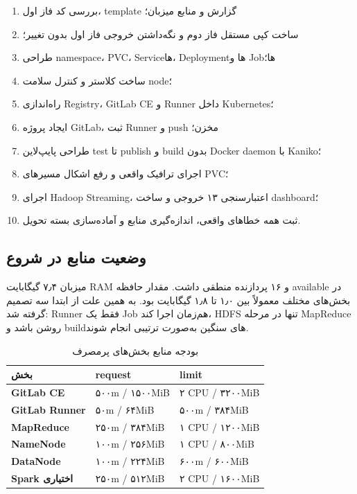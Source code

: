 \documentclass[12pt,a4paper]{article}
\newcommand{\eng}[1]{\lr{#1}}
\begin{document}
\begin{enumerate}
  \item بررسی کد فاز اول، template گزارش و منابع میزبان؛
  \item ساخت کپی مستقل فاز دوم و نگه‌داشتن خروجی فاز اول بدون تغییر؛
  \item طراحی namespace، PVC، Serviceها، Deploymentها و Jobها؛
  \item ساخت کلاستر \eng{kind} و کنترل سلامت node؛
  \item راه‌اندازی Registry، GitLab CE و Runner داخل Kubernetes؛
  \item ایجاد پروژه GitLab، ثبت Runner و push مخزن؛
  \item طراحی پایپ‌لاین test تا publish و build بدون Docker daemon با Kaniko؛
  \item اجرای ترافیک واقعی و رفع اشکال مسیرهای PVC؛
  \item اجرای Hadoop Streaming، اعتبارسنجی ۱۳ خروجی و ساخت dashboard؛
  \item ثبت همه خطاهای واقعی، اندازه‌گیری منابع و آماده‌سازی بسته تحویل.
\end{enumerate}

\subsection{وضعیت منابع در شروع}

میزبان ۷٫۴ گیگابایت RAM و ۱۶ پردازنده منطقی داشت. مقدار حافظه available در
بخش‌های مختلف معمولاً بین ۱٫۰ تا ۱٫۸ گیگابایت بود. به همین علت از ابتدا سه
تصمیم گرفته شد: Runner فقط یک Job هم‌زمان اجرا کند، HDFS تنها در مرحله MapReduce
روشن باشد و buildهای سنگین به‌صورت ترتیبی انجام شوند.

\begin{table}[H]
\centering
\caption{بودجه منابع بخش‌های پرمصرف}
\small
\begin{tabularx}{\textwidth}{>{\bfseries}X p{3.0cm} p{3.0cm}}
\toprule
بخش & request & limit \\
\midrule
GitLab CE & ۵۰۰m / ۱۵۰۰MiB & ۲ CPU / ۳۲۰۰MiB \\
GitLab Runner & ۵۰m / ۶۴MiB & ۵۰۰m / ۳۸۴MiB \\
MapReduce & ۲۵۰m / ۳۸۴MiB & ۱ CPU / ۱۲۰۰MiB \\
NameNode & ۱۰۰m / ۲۵۶MiB & ۱ CPU / ۸۰۰MiB \\
DataNode & ۱۰۰m / ۲۲۴MiB & ۶۰۰m / ۶۰۰MiB \\
Spark اختیاری & ۲۵۰m / ۵۱۲MiB & ۲ CPU / ۱۶۰۰MiB \\
\bottomrule
\end{tabularx}
\end{table}
\end{document}
